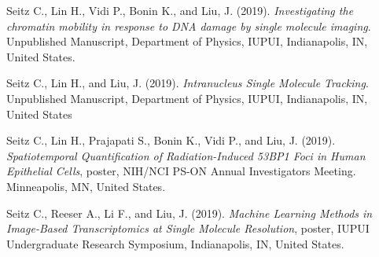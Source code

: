 \documentclass[margin, 10pt]{res} %
\begin{document}
\begin{resume}
Seitz C., Lin H., Vidi P., Bonin K., and Liu, J. (2019). \textit{Investigating the chromatin mobility in response to DNA damage by single molecule imaging}. Unpublished Manuscript, Department of Physics, IUPUI, Indianapolis, IN, United States.

Seitz C., Lin H., and Liu, J. (2019). \textit{Intranucleus Single Molecule Tracking}. Unpublished Manuscript, Department of Physics, IUPUI, Indianapolis, IN, United States	

Seitz C., Lin H., Prajapati S., Bonin K., Vidi P., and Liu, J. (2019). \textit{Spatiotemporal Quantification of Radiation-Induced 53BP1 Foci in Human Epithelial Cells}, poster, NIH/NCI PS-ON Annual Investigators Meeting. Minneapolis, MN, United States.

Seitz C., Reeser A., Li F., and Liu, J. (2019). \textit{Machine Learning Methods in Image-Based Transcriptomics at Single Molecule Resolution}, poster, IUPUI Undergraduate Research Symposium, Indianapolis, IN, United States.

\end{resume}
\end{document}
